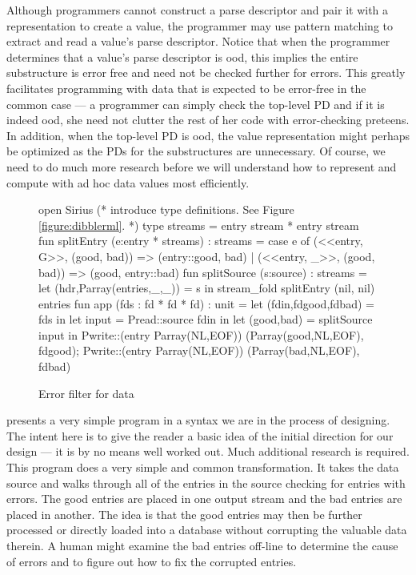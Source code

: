 \documentclass[11pt]{article}
\begin{document}
\noindent
Although programmers cannot construct a parse descriptor and pair it with a
representation to create a value, the programmer may use pattern matching
to extract and read a value's parse descriptor.  Notice that
when the programmer determines that a value's parse descriptor is
ood, this implies the entire substructure is error free
and need not be checked further for errors.  This 
greatly facilitates programming with data that is expected
to be error-free in the common case ---  a programmer can simply check 
the top-level PD and if it is indeed ood,
she need not clutter the rest of her code with error-checking
preteens.  In addition, when the top-level PD is ood,
the value representation might perhaps be optimized as the
PDs for the substructures are unnecessary.  Of course, we
need to do much more research before we will understand how to 
represent and compute with ad hoc data values most efficiently.


\begin{figure}
\begin{code}
open Sirius (* introduce \dibbler type definitions. See Figure \ref{figure:dibblerml}. *) 
\mbox{}
type streams = entry stream * entry stream
\mbox{}
fun splitEntry (e:entry * streams) : streams =
  case e of
    (<<entry, G>>, (good, bad)) => (entry::good, bad)
  | (<<entry, _>>, (good, bad)) => (good, entry::bad)
\mbox{}    
fun splitSource (s:source) : streams =
    let (hdr,Parray(entries,_,_)) = s in 
    stream\_fold splitEntry (nil, nil) entries
\mbox{}
fun app (fds : fd * fd * fd) : unit =  
  let (fdin,fdgood,fdbad) = fds                in
  let input               = Pread::source fdin in
  let (good,bad)          = splitSource input  in
  Pwrite::(entry Parray(NL,EOF)) (Parray(good,NL,EOF), fdgood);
  Pwrite::(entry Parray(NL,EOF)) (Parray(bad,NL,EOF), fdbad)
\end{code}
\caption{Error filter for \dibbler{} data}
\label{figure:newick-clean}
\end{figure}


 presents a very simple \datatype{}
program in a syntax we are in the process of designing.  The
intent here is to give the reader a basic idea of the initial direction
for our design --- it is by no means well worked out.  Much additional
research is required.  This program does a very simple and common
transformation.  It takes the \dibbler{} data source and
walks through all of the entries in the source checking for
entries with errors.  The good entries are placed in
one output stream and the bad entries are placed in another.
The idea is that the good entries may then be further processed
or directly loaded into a database without corrupting
the valuable data therein.  A human might examine
the bad entries off-line to determine the cause of errors
and to figure out how to fix the corrupted entries.
\end{document}
